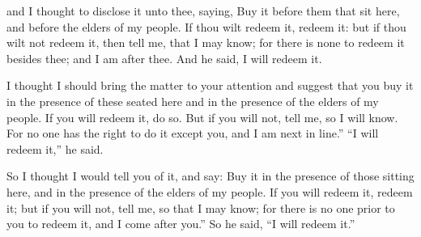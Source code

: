 			\begin{versebox}
					\item[BHS] 
					\item[LXX] 
					\item[ASV] and I thought to disclose it unto thee, saying, Buy it before them that sit here, and before the elders of my people. If thou wilt redeem it, redeem it: but if thou wilt not redeem it, then tell me, that I may know; for there is none to redeem it besides thee; and I am after thee. And he said, I will redeem it.
					\item[NIV] I thought I should bring the matter to your attention and suggest that you buy it in the presence of these seated here and in the presence of the elders of my people. If you will redeem it, do so. But if you will not, tell me, so I will know. For no one has the right to do it except you, and I am next in line.” “I will redeem it,” he said.
					\item[NRSV] So I thought I would tell you of it, and say: Buy it in the presence of those sitting here, and in the presence of the elders of my people. If you will redeem it, redeem it; but if you will not, tell me, so that I may know; for there is no one prior to you to redeem it, and I come after you.” So he said, “I will redeem it.”
			\end{versebox}


